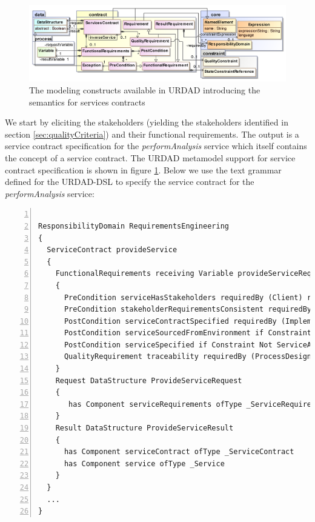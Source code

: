 \begin{itemize}
\begin{itemize}
\begin{figure}[Htbp]
  \centering
  \includegraphics{contract}
  \caption{The modeling constructs available in URDAD introducing the semantics for services contracts}
  \label{fig:contractModule}
\end{figure}

We start by eliciting the stakeholders (yielding the stakeholders identified in section \ref{sec:qualityCriteria}) and their functional requirements. The output is a service contract specification for the \emph{performAnalysis} service which itself contains the concept of a service contract. The URDAD metamodel support for service contract specification is shown in figure \ref{fig:contractModule}. Below we use the text grammar defined for the URDAD-DSL to specify the service contract for the \emph{performAnalysis} service:

\lstset{language=urdad,caption=Specifying a state constraint in the URDAD text grammar.,label=contractTextSyntax}
\begin{lstlisting}[numbers=left,escapechar=|]

ResponsibilityDomain RequirementsEngineering
{
  ServiceContract provideService
  {
    FunctionalRequirements receiving Variable provideServiceRequest ofType ProvideServiceRequest yielding Variable provideServiceResult ofType ProvideServiceResult
    {
      PreCondition serviceHasStakeholders requiredBy (Client) raises NoStakeholdersException checks Constraint ServiceHasStakeholders
      PreCondition stakeholderRequirementsConsistent requiredBy (Client Implementation Testing) raises InconsistentStakeholderRequirementsException checks Constraint RequirementsConsistent
      PostCondition serviceContractSpecified requiredBy (Implementation Testing) ensures Constraint ServiceContractSpecified
      PostCondition serviceSourcedFromEnvironment if Constraint ServiceAvailable requiredBy (Client) ensures Constraint ServiceSourced with Query OCL:"serviceContract"
      PostCondition serviceSpecified if Constraint Not ServiceAvailable requiredBy(Client Implementation) ensures ServiceSpecified
      QualityRequirement traceability requiredBy (ProcessDesign ProjectManagement Development)  
    }
    Request DataStructure ProvideServiceRequest
    {
       has Component serviceRequirements ofType _ServiceRequirements
    }
    Result DataStructure ProvideServiceResult
    {
      has Component serviceContract ofType _ServiceContract
      has Component service ofType _Service
    }        
  }
  ...
} 
\end{lstlisting}


\end{itemize}
\end{itemize}
